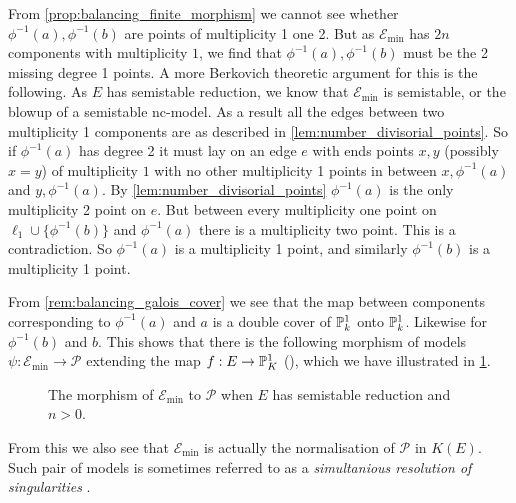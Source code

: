 From \cref{prop:balancing_finite_morphism} we cannot see whether $\phi^{-1}(a), \phi^{-1}(b)$ are points of multiplicity 1 one 2. 
But as $\mathscr E_\text{min} $ has $2n$ components with multiplicity $1$, we find that  $\phi^{-1}(a), \phi^{-1}(b)$ must be the 2 missing degree 1 points. 
A more Berkovich theoretic argument for this is the following. 
As $E$ has semistable reduction, we know that $\mathscr E_\text{min} $ is semistable, or the blowup of a semistable nc-model. 
As a result all the edges between two multiplicity 1 components are as described in \cref{lem:number_divisorial_points}.
So if $\phi ^{-1}(a)$ has degree 2 it must lay on an edge $e$ with ends points $x, y$ (possibly $x = y$) of multiplicity $1$ with no other multiplicity 1 points in between $x, \phi^{-1}(a)$ and $y, \phi^{-1}(a)$. 
By \cref{lem:number_divisorial_points} $\phi^{-1}(a)$ is the only multiplicity 2 point on $e$. 
But between every multiplicity one point on $\ell_1 \cup \{\phi^{-1}(b)\} $ and $\phi^{-1}(a)$ there is a multiplicity two point. 
This is a contradiction. 
So $\phi^{-1}(a)$ is a multiplicity 1 point, and similarly $\phi^{-1}(b)$ is a multiplicity 1 point.  


From \cref{rem:balancing_galois_cover} we see that the map between components corresponding to $\phi^{-1}(a)$ and $a$ is a double cover of $\mathbb{P}^{1}_k$ onto $\mathbb{P}^{1}_k$.
Likewise for $\phi^{-1}(b)$ and $b$. 
This shows that there is the following morphism of models $\psi: \mathscr E_\text{min} \to \mathscr P$ extending the map $f: E \to \mathbb{P}^{1}_K$ (\cite[thm.\ 8.3.20]{liuAlgebraicGeometryArithmetic2002}), which we have illustrated in \cref{fig:morphism_models_semistable_tame}.

\begin{figure}[ht]
    \centering
    \caption{The morphism of $\mathscr E_\text{min} $ to  $\mathscr P$ when $E$ has semistable reduction and $n > 0$.}
    \label{fig:morphism_models_semistable_tame}
\end{figure}
From this we also see that $\mathscr E_\text{min} $ is actually the normalisation of $\mathscr P$ in $K(E)$. 
Such pair of models is sometimes referred to as a \emph{simultanious resolution of singularities} \cite[sec.\ 6]{liuModelsCurvesFinitea}.

